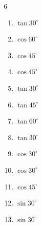 \begin{multicols}{6}
\begin{enumerate}
  \item $\displaystyle \tan{30^\circ}$


\columnbreak %

  \item $\displaystyle \cos{60^\circ}$


  \item $\displaystyle \cos{45^\circ}$


  \item $\displaystyle \cos{45^\circ}$


  \item $\displaystyle \tan{30^\circ}$


  \item $\displaystyle \tan{45^\circ}$

        \phantom{$\displaystyle =1$}

  \item $\displaystyle \tan{60^\circ}$


  \item $\displaystyle \tan{30^\circ}$


  \item $\displaystyle \cos{30^\circ}$


  \item $\displaystyle \cos{30^\circ}$


  \item $\displaystyle \cos{45^\circ}$


  \item $\displaystyle \sin{30^\circ}$


  \item $\displaystyle \sin{30^\circ}$


\end{enumerate}
\end{multicols}
